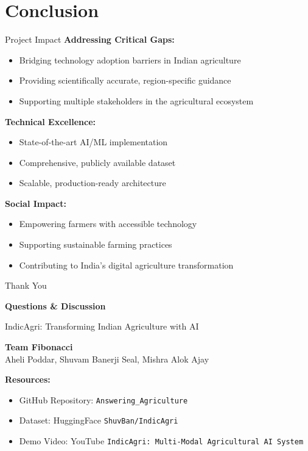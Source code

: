 \documentclass[aspectratio=169]{beamer}
\begin{document}
\section{Conclusion}

\begin{frame}{Project Impact}
\textbf{Addressing Critical Gaps:}
\begin{itemize}
\item Bridging technology adoption barriers in Indian agriculture
\item Providing scientifically accurate, region-specific guidance
\item Supporting multiple stakeholders in the agricultural ecosystem
\end{itemize}

\textbf{Technical Excellence:}
\begin{itemize}
\item State-of-the-art AI/ML implementation
\item Comprehensive, publicly available dataset
\item Scalable, production-ready architecture
\end{itemize}

\textbf{Social Impact:}
\begin{itemize}
\item Empowering farmers with accessible technology
\item Supporting sustainable farming practices
\item Contributing to India's digital agriculture transformation
\end{itemize}
\end{frame}

\begin{frame}{Thank You}
\begin{center}
\Huge{\textbf{Questions \& Discussion}}

\vspace{1cm}
\Large{IndicAgri: Transforming Indian Agriculture with AI}

\vspace{0.5cm}
\textbf{Team Fibonacci} \\
Aheli Poddar, Shuvam Banerji Seal, Mishra Alok Ajay

\vspace{0.5cm}
\textbf{Resources:}
\begin{itemize}
\item GitHub Repository: \texttt{Answering\_Agriculture}
\item Dataset: HuggingFace \texttt{ShuvBan/IndicAgri}
\item Demo Video: YouTube \texttt{IndicAgri: Multi-Modal Agricultural AI System}
\end{itemize}
\end{center}
\end{frame}
\end{document}
